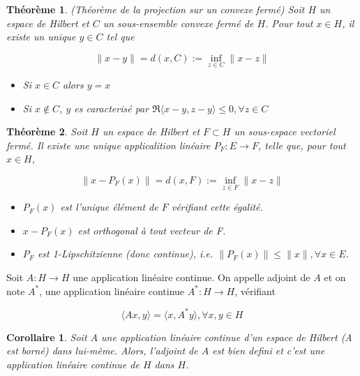 \documentclass[10pt,a4paper,oneside]{article}
\newtheorem{theoreme}{Théorème}
\newtheorem{corollaire}{Corollaire}
\newenvironment{definition}[1][Definition]{\begin{trivlist}
\item[\hskip \labelsep {\bfseries #1}]}{\end{trivlist}}
\begin{document}
\begin{theoreme}
(Théorème de la projection sur un convexe fermé) Soit $H$ un espace de Hilbert et $C$ un sous-ensemble convexe fermé de $H$. Pour tout $x \in H$, il existe un unique $y \in C$ tel que

\[
\| x - y \| = d(x,C) := \inf_{z \in C} \| x - z \|
\]

\begin{itemize}

\item
Si $x \in C$ alors $y = x$

\item
Si $x \not\in C$, $y$ es caracterisé par $\Re \langle x - y,z - y \rangle \leq 0, \forall z \in C$

\end{itemize}

\end{theoreme}


\begin{theoreme}
Soit $H$ un espace de Hilbert et $F \subset H$ un sous-espace vectoriel fermé. Il existe une unique applicalition linéaire $P_F: E \to F$, telle que, pour tout $x \in H$,

\[ \| x - P_F(x) \| = d(x,F) := \inf_{z \in F} \| x - z \| \]

\begin{itemize}
\item
$P_F(x)$ est l'unique élément de $F$ vérifiant cette égalité.

\item
$x - P_F(x)$ est orthogonal à tout vecteur de F.

\item
$P_F$ est 1-Lipschitzienne (donc continue), i.e. $\| P_F(x) \| \leq \| x \|, \forall x \in E$.

\end{itemize}

\end{theoreme}


\begin{definition}
Soit $A:H \rightarrow H$ une application linéaire continue. On appelle adjoint de $A$ et on note $A^*$, une application linéaire continue $A^*:H \rightarrow H$, vérifiant

\[ \langle Ax,y \rangle = \langle x,A^*y \rangle , \forall x,y \in H \]

\end{definition}


\begin{corollaire}
Soit $A$ une application linéaire continue d'un espace de Hilbert (A est borné) dans lui-même. Alors, l'adjoint de $A$ est bien defini et c'est une application linéaire continue de $H$ dans $H$.
\end{corollaire}
\end{document}
